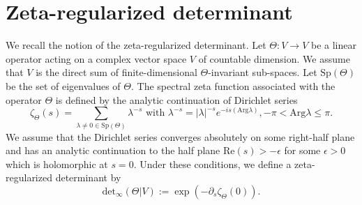 \section{Zeta-regularized determinant}

We recall the notion of the zeta-regularized determinant.
Let $\Theta:V\rightarrow{V}$ be a linear operator acting on a complex vector space $V$ of countable dimension.
We assume that $V$ is the direct sum of finite-dimensional $\Theta$-invariant sub-spaces.
Let $\mathrm{Sp}(\Theta)$ be the set of eigenvalues of $\Theta$. 
The spectral zeta function associated with the operator $\Theta$ is defined by the analytic continuation of Dirichlet series
\begin{equation*}
  \zeta_{\Theta}(s)=\sum_{\lambda\ne0\in\mathrm{Sp}(\Theta)}\lambda^{-s}\text{ with }\lambda^{-s}=|\lambda|^{-s}e^{-is(\mathrm{Arg}\lambda)}, -\pi<\mathrm{Arg}\lambda\le\pi.
\end{equation*}
We assume that the Dirichlet series converges absolutely on some right-half plane and has an analytic continuation to the half plane $\mathrm{Re}(s)>-\epsilon$ for some $\epsilon>0$ which is holomorphic at $s=0$.
Under these conditions, we define a zeta-regularized determinant by
\begin{equation*}
    \mathrm{det}_{\infty}(\Theta|V):=\exp\left(-\partial_{s}\zeta_{\Theta}(0)\right).
\end{equation*}
